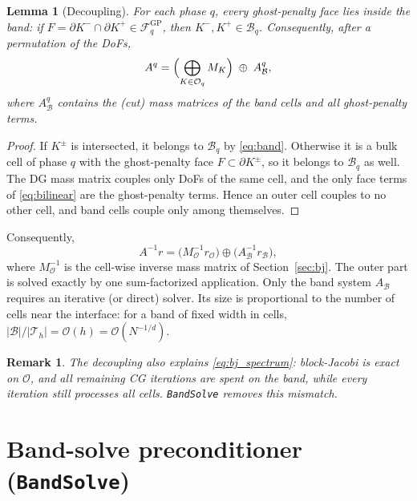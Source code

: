 \documentclass[11pt,a4paper]{article}
\newtheorem{lemma}{Lemma}
\newtheorem{remark}{Remark}
\newcommand{\Th}{\mathcal{T}_h}
\newcommand{\B}{\mathcal{B}}
\newcommand{\Ou}{\mathcal{O}}
\newcommand{\FGP}{\mathcal{F}^{\mathrm{GP}}}
\newcommand{\param}[1]{\texttt{#1}}
\begin{document}
\begin{lemma}[Decoupling]\label{lem:decoupling}
  For each phase $q$, every ghost-penalty face lies inside the band: if
  $F = \partial K^-\cap\partial K^+\in\FGP_q$, then $K^-,K^+\in\B_q$. Consequently, after a
  permutation of the DoFs,
  \begin{equation}
    A^q = \Bigl(\bigoplus_{K\in\Ou_q} M_K\Bigr) \;\oplus\; A^q_{\B},
    \label{eq:decoupling}
  \end{equation}
  where $A^q_\B$ contains the (cut) mass matrices of the band cells and all ghost-penalty terms.
\end{lemma}
\begin{proof}
  If $K^\pm$ is intersected, it belongs to $\B_q$ by \eqref{eq:band}. Otherwise it is a bulk cell of
  phase $q$ with the ghost-penalty face $F\subset\partial K^\pm$, so it belongs to $\B_q$ as well. The
  DG mass matrix couples only DoFs of the same cell, and the only face terms of \eqref{eq:bilinear}
  are the ghost-penalty terms. Hence an outer cell couples to no other cell, and band cells couple
  only among themselves.
\end{proof}

Consequently,
\begin{equation}
  A^{-1} r = \bigl(M_{\Ou}^{-1} r_{\Ou}\bigr) \oplus \bigl(A_\B^{-1} r_\B\bigr),
  \label{eq:exact_inverse}
\end{equation}
where $M_\Ou^{-1}$ is the cell-wise inverse mass matrix of Section~\ref{sec:bj}. The outer part is
solved exactly by one sum-factorized application. Only the band system $A_\B$ requires an
iterative (or direct) solver. Its size is proportional to the number of cells near the interface:
for a band of fixed width in cells, $|\B|/|\Th| = \mathcal{O}(h) = \mathcal{O}(N^{-1/d})$.

\begin{remark}
  The decoupling also explains \eqref{eq:bj_spectrum}: block-Jacobi is exact on $\Ou$, and all
  remaining CG iterations are spent on the band, while every iteration still processes all cells.
  \param{BandSolve} removes this mismatch.
\end{remark}

\section{Band-solve preconditioner (\texorpdfstring{\param{BandSolve}}{BandSolve})}
\label{sec:bs}
\end{document}
